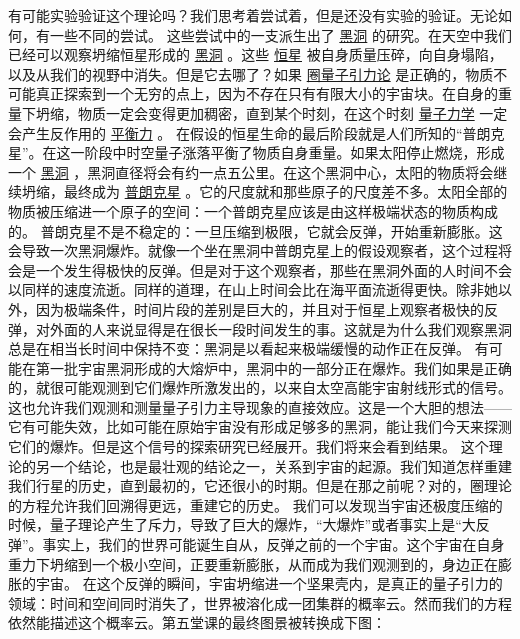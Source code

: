     有可能实验验证这个理论吗？我们思考着尝试着，但是还没有实验的验证。无论如何，有一些不同的尝试。
    这些尝试中的一支派生出了
\href{http://toyhouse.cc/wiki/index.php/黑洞}{黑洞}
的研究。在天空中我们已经可以观察坍缩恒星形成的
\href{http://toyhouse.cc/wiki/index.php/黑洞}{黑洞}
。这些
\href{http://toyhouse.cc/wiki/index.php/恒星}{恒星}
被自身质量压碎，向自身塌陷，以及从我们的视野中消失。但是它去哪了？如果
\href{http://toyhouse.cc/wiki/index.php/圈量子引力论}{圈量子引力论}
是正确的，物质不可能真正探索到一个无穷的点上，因为不存在只有有限大小的宇宙块。在自身的重量下坍缩，物质一定会变得更加稠密，直到某个时刻，在这个时刻
\href{http://toyhouse.cc/wiki/index.php/量子力学}{量子力学}
一定会产生反作用的
\href{http://toyhouse.cc/wiki/index.php/平衡力}{平衡力}
。
    在假设的恒星生命的最后阶段就是人们所知的“普朗克星”。在这一阶段中时空量子涨落平衡了物质自身重量。如果太阳停止燃烧，形成一个
\href{http://toyhouse.cc/wiki/index.php/黑洞}{黑洞}
，黑洞直径将会有约一点五公里。在这个黑洞中心，太阳的物质将会继续坍缩，最终成为
\href{http://toyhouse.cc/wiki/index.php/普朗克星}{普朗克星}
。它的尺度就和那些原子的尺度差不多。太阳全部的物质被压缩进一个原子的空间：一个普朗克星应该是由这样极端状态的物质构成的。
    普朗克星不是不稳定的：一旦压缩到极限，它就会反弹，开始重新膨胀。这会导致一次黑洞爆炸。就像一个坐在黑洞中普朗克星上的假设观察者，这个过程将会是一个发生得极快的反弹。但是对于这个观察者，那些在黑洞外面的人时间不会以同样的速度流逝。同样的道理，在山上时间会比在海平面流逝得更快。除非她以外，因为极端条件，时间片段的差别是巨大的，并且对于恒星上观察者极快的反弹，对外面的人来说显得是在很长一段时间发生的事。这就是为什么我们观察黑洞总是在相当长时间中保持不变：黑洞是以看起来极端缓慢的动作正在反弹。
    有可能在第一批宇宙黑洞形成的大熔炉中，黑洞中的一部分正在爆炸。我们如果是正确的，就很可能观测到它们爆炸所激发出的，以来自太空高能宇宙射线形式的信号。这也允许我们观测和测量量子引力主导现象的直接效应。这是一个大胆的想法——它有可能失效，比如可能在原始宇宙没有形成足够多的黑洞，能让我们今天来探测它们的爆炸。但是这个信号的探索研究已经展开。我们将来会看到结果。
    这个理论的另一个结论，也是最壮观的结论之一，关系到宇宙的起源。我们知道怎样重建我们行星的历史，直到最初的，它还很小的时期。但是在那之前呢？对的，圈理论的方程允许我们回溯得更远，重建它的历史。
    我们可以发现当宇宙还极度压缩的时候，量子理论产生了斥力，导致了巨大的爆炸，“大爆炸”或者事实上是“大反弹”。事实上，我们的世界可能诞生自从，反弹之前的一个宇宙。这个宇宙在自身重力下坍缩到一个极小空间，正要重新膨胀，从而成为我们观测到的，身边正在膨胀的宇宙。
    在这个反弹的瞬间，宇宙坍缩进一个坚果壳内，是真正的量子引力的领域：时间和空间同时消失了，世界被溶化成一团集群的概率云。然而我们的方程依然能描述这个概率云。第五堂课的最终图景被转换成下图：

